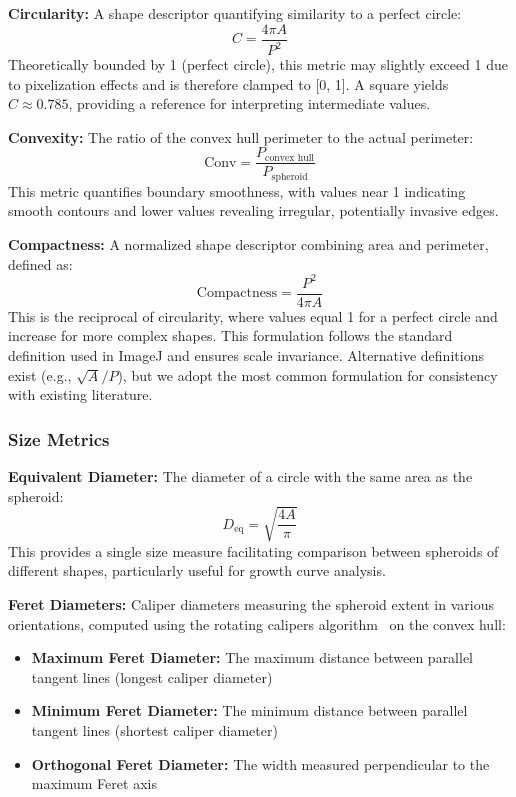 \documentclass[preprint,12pt]{elsarticle}
\begin{document}
\textbf{Circularity:} A shape descriptor quantifying similarity to a perfect circle:
\begin{equation}
C = \frac{4\pi A}{P^2}
\end{equation}
Theoretically bounded by 1 (perfect circle), this metric may slightly exceed 1 due to pixelization effects and is therefore clamped to [0, 1]. A square yields $C \approx 0.785$, providing a reference for interpreting intermediate values.

\textbf{Convexity:} The ratio of the convex hull perimeter to the actual perimeter:
\begin{equation}
\text{Conv} = \frac{P_{\text{convex hull}}}{P_{\text{spheroid}}}
\end{equation}
This metric quantifies boundary smoothness, with values near 1 indicating smooth contours and lower values revealing irregular, potentially invasive edges.

\textbf{Compactness:} A normalized shape descriptor combining area and perimeter, defined as:
\begin{equation}
\text{Compactness} = \frac{P^2}{4\pi A}
\end{equation}
This is the reciprocal of circularity, where values equal 1 for a perfect circle and increase for more complex shapes. This formulation follows the standard definition used in ImageJ and ensures scale invariance. Alternative definitions exist (e.g., $\sqrt{A}/P$), but we adopt the most common formulation for consistency with existing literature.

\subsubsection{Size Metrics}

\textbf{Equivalent Diameter:} The diameter of a circle with the same area as the spheroid:
\begin{equation}
D_{\text{eq}} = \sqrt{\frac{4A}{\pi}}
\end{equation}
This provides a single size measure facilitating comparison between spheroids of different shapes, particularly useful for growth curve analysis.

\textbf{Feret Diameters:} Caliper diameters measuring the spheroid extent in various orientations, computed using the rotating calipers algorithm~\cite{Toussaint1983} on the convex hull:
\begin{itemize}\setlength\itemsep{-0.2em}
    \item \textbf{Maximum Feret Diameter:} The maximum distance between parallel tangent lines (longest caliper diameter)
    \item \textbf{Minimum Feret Diameter:} The minimum distance between parallel tangent lines (shortest caliper diameter)
    \item \textbf{Orthogonal Feret Diameter:} The width measured perpendicular to the maximum Feret axis
\end{itemize}
\end{document}
